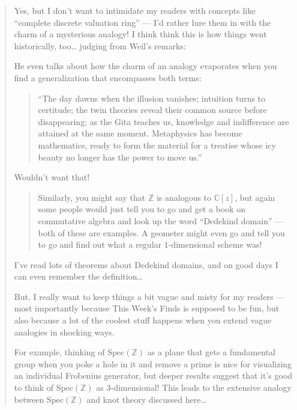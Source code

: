 \documentclass{article}
\def\tightlist{}
\renewcommand{\texttt}[1]{%
  \begingroup
  \ttfamily
  \begingroup\lccode`~=`/\lowercase{\endgroup\def~}{/\discretionary{}{}{}}%
  \begingroup\lccode`~=`[\lowercase{\endgroup\def~}{[\discretionary{}{}{}}%
  \begingroup\lccode`~=`.\lowercase{\endgroup\def~}{.\discretionary{}{}{}}%
  \catcode`/=\active\catcode`[=\active\catcode`.=\active
  \scantokens{#1\noexpand}%
  \endgroup
}
\begin{document}
\begin{quote}
Yes, but I don't want to intimidate my readers with concepts like
``complete discrete valuation ring'' --- I'd rather lure them in with
the charm of a mysterious analogy! I think think this is how things went
historically, too\ldots{} judging from Weil's remarks:


He even talks about how the charm of an analogy evaporates when you find
a generalization that encompasses both terms:

\begin{quote}
``The day dawns when the illusion vanishes; intuition turns to
certitude; the twin theories reveal their common source before
disappearing; as the Gita teaches us, knowledge and indifference are
attained at the same moment. Metaphysics has become mathematics, ready
to form the material for a treatise whose icy beauty no longer has the
power to move us.''
\end{quote}

Wouldn't want that!

\begin{quote}
Similarly, you might say that \(\mathbb{Z}\) is analogous to
\(\mathbb{C}[z]\), but again some people would just tell you to go and
get a book on commutative algebra and look up the word ``Dedekind
domain'' --- both of these are examples. A geometer might even go and
tell you to go and find out what a regular \(1\)-dimensional scheme was!
\end{quote}

I've read lots of theorems about Dedekind domains, and on good days I
can even remember the definition\ldots{}

But, I really want to keep things a bit vague and misty for my readers
--- most importantly because This Week's Finds is supposed to be fun,
but also because a lot of the coolest stuff happens when you extend
vague analogies in shocking ways.

For example, thinking of \(\mathrm{Spec}(\mathbb{Z})\) as a plane that
gets a fundamental group when you poke a hole in it and remove a prime
is nice for visualizing an individual Frobenius generator, but deeper
results suggest that it's good to think of \(\mathrm{Spec}(\mathbb{Z})\)
as \(3\)-dimensional! This leads to the extensive analogy between
\(\mathrm{Spec}(\mathbb{Z})\) and knot theory discussed here\ldots{}


\end{quote}
\end{document}
